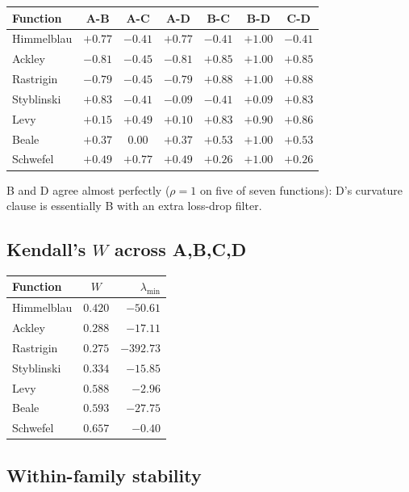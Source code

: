 \documentclass[11pt]{article}
\begin{document}
\begin{center}
\small
\begin{tabular}{lcccccc}
\toprule
Function & A-B & A-C & A-D & B-C & B-D & C-D \\
\midrule
Himmelblau & $+0.77$ & $-0.41$ & $+0.77$ & $-0.41$ & $+1.00$ & $-0.41$ \\
Ackley     & $-0.81$ & $-0.45$ & $-0.81$ & $+0.85$ & $+1.00$ & $+0.85$ \\
Rastrigin  & $-0.79$ & $-0.45$ & $-0.79$ & $+0.88$ & $+1.00$ & $+0.88$ \\
Styblinski & $+0.83$ & $-0.41$ & $-0.09$ & $-0.41$ & $+0.09$ & $+0.83$ \\
Levy       & $+0.15$ & $+0.49$ & $+0.10$ & $+0.83$ & $+0.90$ & $+0.86$ \\
Beale      & $+0.37$ & $0.00$  & $+0.37$ & $+0.53$ & $+1.00$ & $+0.53$ \\
Schwefel   & $+0.49$ & $+0.77$ & $+0.49$ & $+0.26$ & $+1.00$ & $+0.26$ \\
\bottomrule
\end{tabular}
\end{center}

B and D agree almost perfectly ($\rho=1$ on five of seven functions): D's
curvature clause is essentially B with an extra loss-drop filter.

\subsection{Kendall's $W$ across A,B,C,D}

\begin{center}
\begin{tabular}{lcr}
\toprule
Function & $W$ & $\lambda_{\min}$ \\
\midrule
Himmelblau & $0.420$ & $-50.61$ \\
Ackley     & $0.288$ & $-17.11$ \\
Rastrigin  & $0.275$ & $-392.73$ \\
Styblinski & $0.334$ & $-15.85$ \\
Levy       & $0.588$ & $-2.96$ \\
Beale      & $0.593$ & $-27.75$ \\
Schwefel   & $0.657$ & $-0.40$ \\
\bottomrule
\end{tabular}
\end{center}

\subsection{Within-family stability}
\end{document}
